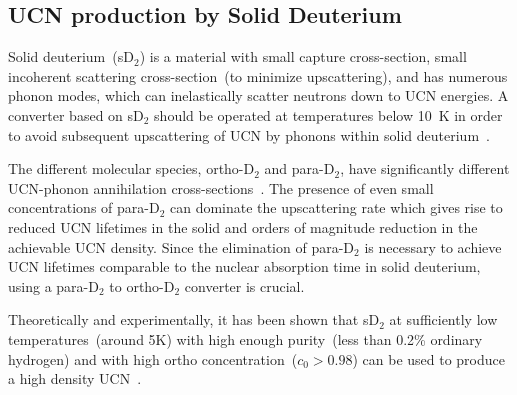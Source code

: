 


\subsection{UCN production by Solid Deuterium}
Solid deuterium~(sD$_2$) is a material with small capture
cross-section, small incoherent scattering cross-section~(to minimize
upscattering), and has numerous phonon modes, which can inelastically
scatter neutrons down to UCN energies.  A converter based on sD$_2$
should be operated at temperatures below 10~K in order to avoid
subsequent upscattering of UCN by phonons within solid
deuterium~\cite{Frei2010}.

The different molecular species, ortho-D$_2$ and para-D$_2$, have
significantly different UCN-phonon annihilation
cross-sections~\cite{Liu2000, Morris2002}. The presence of even small
concentrations of para-D$_2$ can dominate the upscattering rate which
gives rise to reduced UCN lifetimes in the solid and orders of
magnitude reduction in the achievable UCN density.
Since the elimination of para-D$_2$ is necessary to achieve UCN
lifetimes comparable to the nuclear absorption time in solid
deuterium, using a para-D$_2$ to ortho-D$_2$ converter is crucial.


Theoretically and experimentally, it has been shown that sD$_2$ at
sufficiently low temperatures~(around 5K) with high enough
purity~(less than 0.2\% ordinary hydrogen) and with high ortho
concentration~($c_0 > 0.98$) can be used to produce a high density
UCN~\cite{Atchison2005}.



